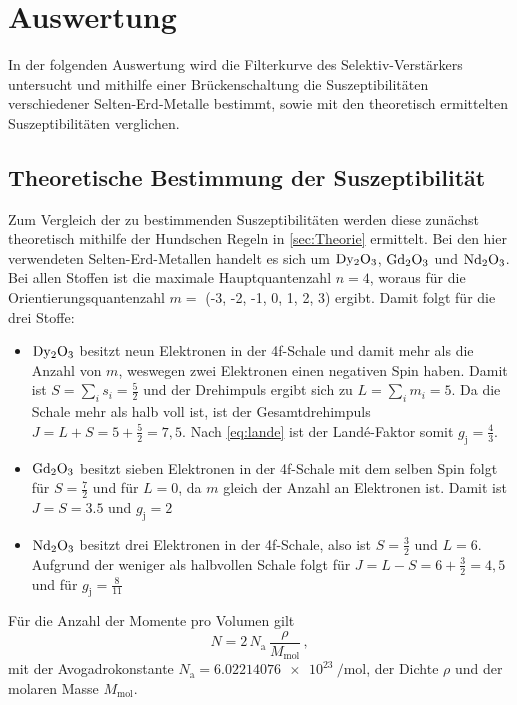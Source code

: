 \section{Auswertung}
\label{sec:Auswertung}

In der folgenden Auswertung wird die Filterkurve des Selektiv-Verstärkers untersucht
und mithilfe einer Brückenschaltung die Suszeptibilitäten verschiedener Selten-Erd-Metalle bestimmt,
sowie mit den theoretisch ermittelten Suszeptibilitäten verglichen.


\subsection{Theoretische Bestimmung der Suszeptibilität}

Zum Vergleich der zu bestimmenden Suszeptibilitäten werden diese zunächst theoretisch mithilfe der Hundschen Regeln in \autoref{sec:Theorie} ermittelt.
Bei den hier verwendeten Selten-Erd-Metallen handelt es sich um $\ce{Dy2O3}$, $\ce{Gd2O3}$ und $\ce{Nd2O3}$.
Bei allen Stoffen ist die maximale Hauptquantenzahl $n = 4$, woraus für die Orientierungsquantenzahl $m =$ (-3, -2, -1, 0, 1, 2, 3) ergibt. 
Damit folgt für die drei Stoffe:

\begin{itemize}
  \item $\ce{Dy2O3}$ besitzt neun Elektronen in der 4f-Schale und damit mehr als die Anzahl von $m$, weswegen zwei Elektronen einen negativen Spin haben.
        Damit ist $ S = \sum_{i} s_i = \frac{5}{2}$ und der Drehimpuls ergibt sich zu $L = \sum_i m_i = 5$.
        Da die Schale mehr als halb voll ist, ist der Gesamtdrehimpuls $J = L + S = 5 + \frac{5}{2} = 7,5$.
        Nach \autoref{eq:lande} ist der Landé-Faktor somit $g_\text{j} = \frac{4}{3}$.

  \item $\ce{Gd2O3}$ besitzt sieben Elektronen in der 4f-Schale mit dem selben Spin folgt für $S = \frac{7}{2}$ und für $L = 0$, da $m$ gleich der Anzahl an Elektronen ist.
        Damit ist $J = S = 3.5$ und $g_\text{j} = 2$

  \item $\ce{Nd2O3}$ besitzt drei Elektronen in der 4f-Schale, also ist $S = \frac{3}{2}$ und $L = 6$.
        Aufgrund der weniger als halbvollen Schale folgt für $J = L - S = 6 + \frac{3}{2} = 4,5$ und für $g_\text{j} = \frac{8}{11}$
\end{itemize}

Für die Anzahl der Momente pro Volumen gilt
\begin{equation}
  N = 2 \, N_\text{a} \, \frac{\rho}{M_\text{mol}} \, ,
\end{equation}
mit der Avogadrokonstante $N_\text{a} = \qty{6.02214076e23}{\per\mol}$, der Dichte $\rho$ und der molaren Masse $M_\text{mol}$.

